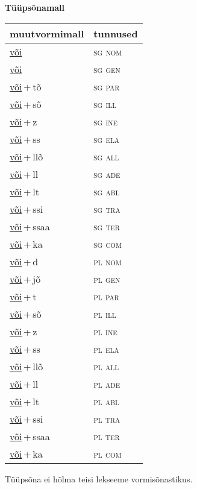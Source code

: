
\vspace{1.8em}
\begin{minipage}{\textwidth}
\textbf{Tüüpsõnamall \,}\\

\begin{sideways}
\begin{tabular}{l l}
muutvormimall & tunnused \\
\hline
\underline{või} & \textsc{ sg nom } \\
\underline{või} & \textsc{ sg gen } \\
\underline{või}\,+\,tõ & \textsc{ sg par } \\
\underline{või}\,+\,sõ & \textsc{ sg ill } \\
\underline{või}\,+\,z & \textsc{ sg ine } \\
\underline{või}\,+\,ss & \textsc{ sg ela } \\
\underline{või}\,+\,llõ & \textsc{ sg all } \\
\underline{või}\,+\,ll & \textsc{ sg ade } \\
\underline{või}\,+\,lt & \textsc{ sg abl } \\
\underline{või}\,+\,ssi & \textsc{ sg tra } \\
\underline{või}\,+\,ssaa & \textsc{ sg ter } \\
\underline{või}\,+\,ka & \textsc{ sg com } \\
\underline{või}\,+\,d & \textsc{ pl nom } \\
\underline{või}\,+\,jõ & \textsc{ pl gen } \\
\underline{või}\,+\,t & \textsc{ pl par } \\
\underline{või}\,+\,sõ & \textsc{ pl ill } \\
\underline{või}\,+\,z & \textsc{ pl ine } \\
\underline{või}\,+\,ss & \textsc{ pl ela } \\
\underline{või}\,+\,llõ & \textsc{ pl all } \\
\underline{või}\,+\,ll & \textsc{ pl ade } \\
\underline{või}\,+\,lt & \textsc{ pl abl } \\
\underline{või}\,+\,ssi & \textsc{ pl tra } \\
\underline{või}\,+\,ssaa & \textsc{ pl ter } \\
\underline{või}\,+\,ka & \textsc{ pl com } \\
\end{tabular}
\end{sideways}
\label{tab:tüüpsõnamall-või}

\end{minipage}

 
\vspace{1em}
\noindent Tüüpsõna ei hõlma teisi lekseeme vormi\-sõnastikus.
